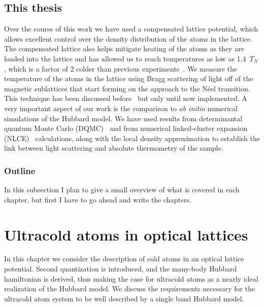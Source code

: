 \documentclass[oneside,11pt]{memoir}
\begin{document}
\section{This thesis}

Over the course of this work we have used a compensated lattice potential,
which allows excellent control over the density distribution of the atoms in
the lattice.  The compensated lattice also helps mitigate heating of the atoms
as they are loaded into the lattice and has allowed us to reach temperatures as
low as 1.4~$T_{N}$, which is a factor of 2 colder than previous
experiments~\cite{Imriska2014}.  We measure the temperature of the atoms in the
lattice using Bragg scattering of light off of the magnetic sublattices that
start forming on the approach to the N\'{e}el transition.  This technique has
been discussed before~\cite{Ted2010} but only until now implemented.   A very
important aspect of our work is the comparison to \textit{ab initio} numerical
simulations of the Hubbard model.   We have used results from determinantal
quantum Monte Carlo (DQMC)~\cite{Paiva2011} and from numerical linked-cluster
expansion (NLCE)~\cite{Rigol2006} calculations,  along with the local density
approximation to establish the link between light scattering and absolute
thermometry of the sample. 

\subsection{Outline}

In this subsection I plan to give a small overview of what is covered in each
chapter,  but first I have to go ahead and write the chapters.   








\chapter{Ultracold atoms in optical lattices}

In this chapter we consider the description of cold atoms in an optical lattice
potential.    Second quantization is introduced, and the many-body Hubbard
hamiltonian is derived, thus making the case for ultracold atoms as a nearly
ideal realization of the Hubbard model.  
We discuss the requirements necessary for the ultracold atom system to be well
described by a single band Hubbard model.  
\end{document}
